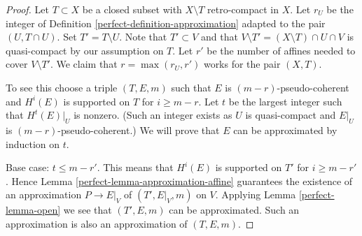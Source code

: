 \begin{proof}

Let $T \subset X$ be a closed subset with $X \setminus T$ retro-compact
in $X$. Let $r_U$ be the integer of Definition \ref{perfect-definition-approximation}
adapted to the pair $(U, T \cap U)$.
Set $T' = T \setminus U$. Note that
$T' \subset V$ and that $V \setminus T' = (X \setminus T) \cap U \cap V$
is quasi-compact by our assumption on $T$.
Let $r'$ be the number of affines needed to cover $V \setminus T'$.
We claim that $r = \max(r_U, r')$ works for the pair $(X, T)$.

\medskip\noindent
To see this choose a triple $(T, E, m)$ such that $E$ is
$(m - r)$-pseudo-coherent and $H^i(E)$ is supported on $T$ for
$i \geq m - r$. Let $t$ be the largest integer such that
$H^t(E)|_U$ is nonzero. (Such an integer exists as $U$ is quasi-compact
and $E|_U$ is $(m - r)$-pseudo-coherent.)
We will prove that $E$ can be approximated by induction on $t$.

\medskip\noindent
Base case: $t \leq m - r'$. This means that $H^i(E)$ is supported
on $T'$ for $i \geq m - r'$. Hence
Lemma \ref{perfect-lemma-approximation-affine}
guarantees the existence of an approximation
$P \to E|_V$ of $(T', E|_V, m)$ on $V$.
Applying Lemma \ref{perfect-lemma-open} we see that
$(T', E, m)$ can be approximated. Such an approximation
is also an approximation of $(T, E, m)$.


\end{proof}
